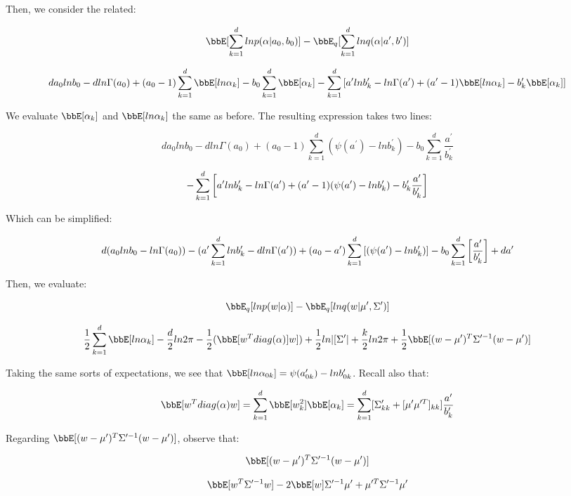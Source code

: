 \documentclass[twoside,11pt]{homework}
\begin{document}
Then, we consider the related:

\[
\bbE[ \sum_{k=1}^d ln p(\alpha | a_0, b_0)] - \bbE_q[\sum_{k=1}^d lnq(\alpha | a^\prime, b^\prime)]
\]

\[
da_0lnb_0 - dln\Gamma(a_0) + (a_0 - 1)\sum_{k=1}^d \bbE[ln\alpha_k] - b_0\sum_{k=1}^d \bbE[\alpha_k]
- \sum_{k=1}^d \Brackets{
a^\prime lnb^\prime_k - ln\Gamma(a^\prime) + (a^\prime - 1)\bbE[ln\alpha_k] - b^\prime_k \bbE[\alpha_k]
}
\]

We evaluate $\bbE[\alpha_k]$ and $\bbE[ln\alpha_k]$ the same as before. The resulting expression takes two lines:

\[
da_0lnb_0 - dln\Gamma(a_0) + (a_0 - 1)\sum_{k=1}^d (\psi(a^\prime) - lnb^\prime_k) - b_0\sum_{k=1}^d \frac{a^\prime}{b^\prime_k}
\]

\[
- \sum_{k=1}^d \left[
a^\prime lnb^\prime_k - ln\Gamma(a^\prime)
+ (a^\prime - 1)(\psi(a^\prime) - lnb^\prime_k)
- b^\prime_k \frac{a^\prime}{b^\prime_k}
 \right] 
\]

Which can be simplified:

\begin{equation}
d(a_0lnb_0 - ln\Gamma(a_0)) - (a^\prime \sum_{k=1}^d lnb^\prime_k - dln\Gamma(a^\prime))
+ (a_0 - a^\prime)\sum_{k=1}^d \left[(\psi(a^\prime) - lnb^\prime_k)\right]
- b_0\sum_{k=1}^d \left[\frac{a^\prime}{b^\prime_k}\right] + da^\prime
\end{equation}

Then, we evaluate:

\[
\bbE_q[ln p(w | \alpha)]
- \bbE_q[lnq(w | \mu^\prime, \Sigma^\prime)]
\]

\[
 \frac{1}{2}\sum_{k=1}^d \bbE[ln\alpha_k] - \frac{d}{2}ln2\pi - \frac{1}{2}(\bbE[w^Tdiag(\alpha)]w])
 + \frac{1}{2}ln|[\Sigma^\prime| + \frac{k}{2}ln2\pi + \frac{1}{2}\bbE[(w - \mu^\prime)^T\Sigma^{\prime -1}(w - \mu^\prime)]
\]

Taking the same sorts of expectations, we see that $\bbE[ln\alpha_{0k}] = \psi(a^\prime_{0k}) - lnb^\prime_{0k}$.
Recall also that:

\[
\bbE[w^Tdiag(\alpha)w]
= \sum_{k=1}^d \bbE[w_k^2] \bbE[\alpha_k]
= \sum_{k=1}^d [\Sigma^\prime_{kk} + [\mu^\prime \mu^{\prime T}]_{kk}]\frac{a^\prime}{b^\prime_k}
\]

Regarding $\bbE[(w - \mu^\prime)^T\Sigma^{\prime -1}(w - \mu^\prime)]$, observe that:

\[
\bbE[(w - \mu^\prime)^T\Sigma^{\prime -1}(w - \mu^\prime)]
\]

\[
\bbE[w^T \Sigma^{\prime -1}w]
- 2\bbE[w]\Sigma^{\prime -1} \mu^\prime
+ \mu^{\prime T}\Sigma^{\prime -1} \mu^\prime
\]
\end{document}
